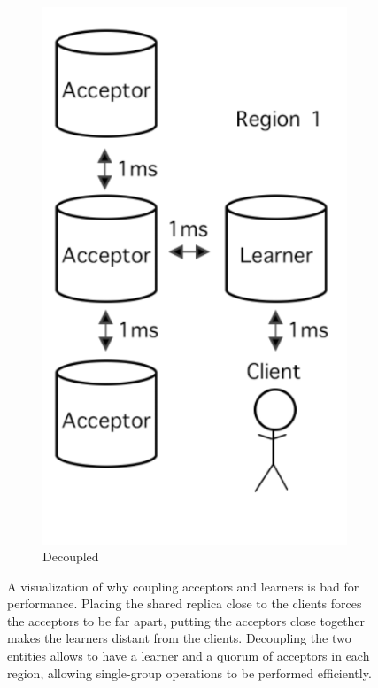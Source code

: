 \begin{figure}[htb]
\begin{subfigure}[b]{0.22\textwidth}
      \includegraphics[width=\textwidth,height=\textheight,keepaspectratio]{img/decoupling_good.png}
      \caption{Decoupled}
      \label{fig:decoupling_good}
  \end{subfigure}
     \caption{A visualization of why coupling acceptors and learners is bad for performance. Placing the shared replica close to the clients forces the acceptors to be far apart, putting the acceptors close together makes the learners distant from the clients. Decoupling the two entities allows to have a learner and a quorum of acceptors in each region, allowing single-group operations to be performed efficiently.}
     \label{fig:decoupling}
\end{figure}


